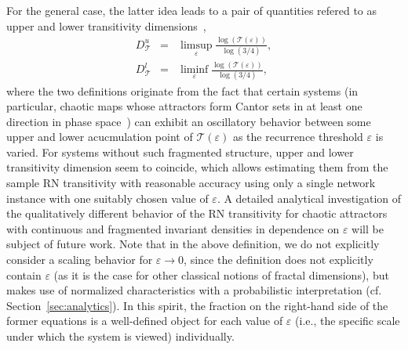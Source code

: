 For the general case, the latter idea leads to a pair of quantities refered to as upper and lower transitivity dimensions~\cite{Donner2011EPJB},
\begin{eqnarray}
D_{\mathcal{T}}^u &=& \limsup_{\varepsilon} \frac{\log(\mathcal{T}(\varepsilon))}{\log(3/4)}, \label{eq:dtu} \\
D_{\mathcal{T}}^l &=& \liminf_{\varepsilon} \frac{\log(\mathcal{T}(\varepsilon))}{\log(3/4)}, \label{eq:dtl}
\end{eqnarray}
\noindent
where the two definitions originate from the fact that certain systems (in particular, chaotic maps whose attractors form Cantor sets in at least one direction in phase space~\cite{Donner2011EPJB}) can exhibit an oscillatory behavior between some upper and lower acucmulation point of $\mathcal{T}(\varepsilon)$ as the recurrence threshold $\varepsilon$ is varied. For systems without such fragmented structure, upper and lower transitivity dimension seem to coincide, which allows estimating them from the sample RN transitivity with reasonable accuracy using only a single network instance with one suitably chosen value of $\varepsilon$. A detailed analytical investigation of the qualitatively different behavior of the RN transitivity for chaotic attractors with continuous and fragmented invariant densities in dependence on $\varepsilon$ will be subject of future work. Note that in the above definition, we do not explicitly consider a scaling behavior for $\varepsilon\to 0$, since the definition does not explicitly contain $\varepsilon$ (as it is the case for other classical notions of fractal dimensions), but makes use of normalized characteristics with a probabilistic interpretation (cf. Section~\ref{sec:analytics}). In this spirit, the fraction on the right-hand side of the former equations is a well-defined object for each value of $\varepsilon$ (i.e., the specific scale under which the system is viewed) individually.


